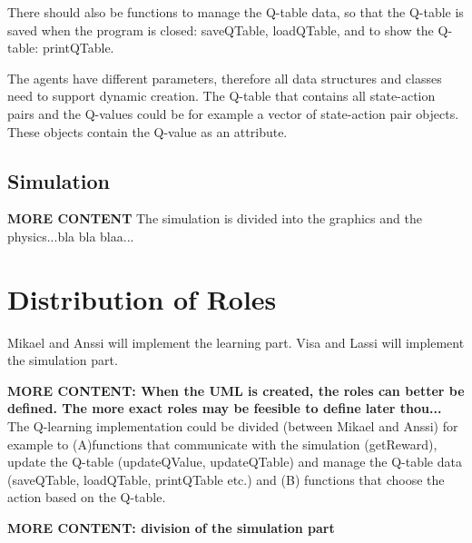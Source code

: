 \documentclass{article}
\begin{document}
There should also be functions to manage the Q-table data, so that the Q-table is
saved when the program is closed: saveQTable, loadQTable, and to show the Q-table:
printQTable.

The agents have different parameters, therefore all data structures and classes
need to support dynamic creation. The Q-table that contains all state-action pairs
and the Q-values could be for example a vector of state-action pair objects. These
objects contain the Q-value as an attribute.


\subsection{Simulation}
\textbf{MORE CONTENT}
The simulation is divided into the graphics and the physics...bla bla blaa...



\section{Distribution of Roles}
Mikael and Anssi will implement the learning part.
Visa and Lassi will implement the simulation part.

\textbf{MORE CONTENT: When the UML is created, the roles can better be defined.
  The more exact roles may be feesible to define later thou...}
The Q-learning implementation could be divided (between Mikael and Anssi) for
example to (A)functions that communicate with the simulation (getReward), update
the Q-table (updateQValue, updateQTable) and manage the Q-table data (saveQTable,
loadQTable, printQTable etc.) and (B) functions that choose the action based on
the Q-table.

\textbf{MORE CONTENT: division of the simulation part}
\end{document}
